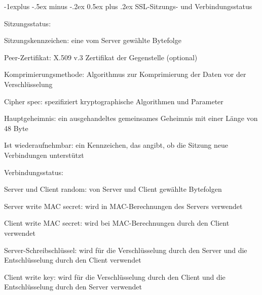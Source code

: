 \documentclass[a4paper]{article}
\makeatletter
\renewcommand{\subsection}{\@startsection{subsection}{2}{0mm}%
 {-1explus -.5ex minus -.2ex}%
 {0.5ex plus .2ex}%
 {\normalfont\normalsize\bfseries}}
\makeatother
\begin{document}
\begin{multicols}{3}
      \subsection{SSL-Sitzungs- und Verbindungsstatus}
      \begin{itemize*}
            \item Sitzungsstatus:
            \begin{itemize*}
                  \item Sitzungskennzeichen: eine vom Server gewählte Bytefolge
                  \item Peer-Zertifikat: X.509 v.3 Zertifikat der Gegenstelle (optional)
                  \item Komprimierungsmethode: Algorithmus zur Komprimierung der Daten vor der Verschlüsselung
                  \item Cipher spec: spezifiziert kryptographische Algorithmen und Parameter
                  \item Hauptgeheimnis: ein ausgehandeltes gemeinsames Geheimnis mit einer Länge von 48 Byte
                  \item Ist wiederaufnehmbar: ein Kennzeichen, das angibt, ob die Sitzung neue Verbindungen unterstützt
            \end{itemize*}
            \item Verbindungsstatus:
            \begin{itemize*}
                  \item Server und Client random: von Server und Client gewählte Bytefolgen
                  \item Server write MAC secret: wird in MAC-Berechnungen des Servers verwendet
                  \item Client write MAC secret: wird bei MAC-Berechnungen durch den Client verwendet
                  \item Server-Schreibschlüssel: wird für die Verschlüsselung durch den Server und die Entschlüsselung durch den Client verwendet
                  \item Client write key: wird für die Verschlüsselung durch den Client und die Entschlüsselung durch den Server verwendet
            \end{itemize*}
      \end{itemize*}


\end{multicols}
\end{document}

